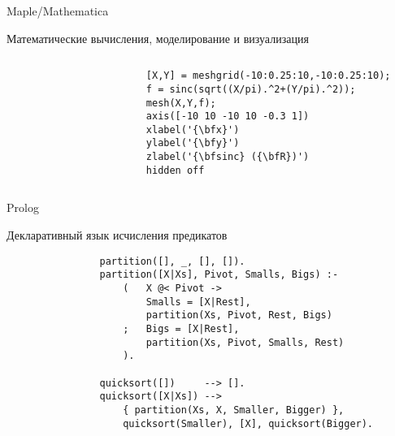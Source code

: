 \documentclass[aspectratio=169,14pt]{beamer}
\begin{document}
    \begin{frame}[fragile]{Maple/Mathematica}
        \begin{block}{{\normalsize Математические вычисления, моделирование и визуализация}}
            \begin{columns}[T]
                \begin{column}{0.4\textwidth}
                    \pause
                    \begin{verbatim}
                        [X,Y] = meshgrid(-10:0.25:10,-10:0.25:10);
                        f = sinc(sqrt((X/pi).^2+(Y/pi).^2));
                        mesh(X,Y,f);
                        axis([-10 10 -10 10 -0.3 1])
                        xlabel('{\bfx}')
                        ylabel('{\bfy}')
                        zlabel('{\bfsinc} ({\bfR})')
                        hidden off
                    \end{verbatim}
                \end{column}
                \begin{column}{0.6\textwidth}
                    \pause
                    \begin{center}
                        \tiny
                        
                    \end{center}
                \end{column}
            \end{columns}
        \end{block}
    \end{frame}

    \begin{frame}[fragile]{Prolog}
        \begin{block}{{\large Декларативный язык исчисления предикатов}}
            \pause
            \begin{verbatim}
                partition([], _, [], []).
                partition([X|Xs], Pivot, Smalls, Bigs) :-
                    (   X @< Pivot ->
                        Smalls = [X|Rest],
                        partition(Xs, Pivot, Rest, Bigs)
                    ;   Bigs = [X|Rest],
                        partition(Xs, Pivot, Smalls, Rest)
                    ).

                quicksort([])     --> [].
                quicksort([X|Xs]) -->
                    { partition(Xs, X, Smaller, Bigger) },
                    quicksort(Smaller), [X], quicksort(Bigger).
            \end{verbatim}
        \end{block}
    \end{frame}
\end{document}
